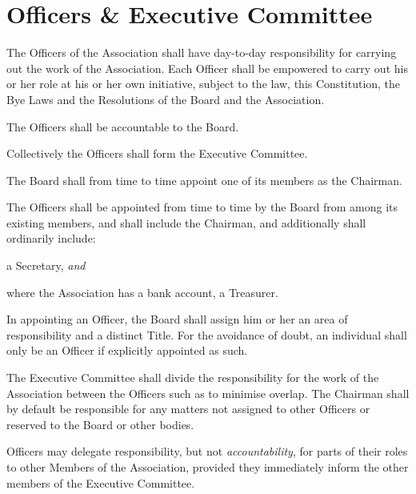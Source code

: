 \documentclass[12pt]{article}
\newcommand{\EC}[0]{Board}
\newcommand{\Exec}[0]{\EC{} }
\newcommand{\avoiddoubt}[0]{For the avoidance of doubt}
\newcommand{\ITand}[0]{\textit{and}}
\begin{document}
\section{Officers \& Executive Committee}
  \begin{constenum}
    \item The Officers of the Association shall have day-to-day
      responsibility for carrying out the work of the Association.
      Each Officer shall be empowered to carry out his or her role at
      his or her own initiative, subject to the law, this
      Constitution, the Bye Laws and the Resolutions of the \Exec and
      the Association.

    \item The Officers shall be accountable to the \EC{}.

    \item Collectively the Officers shall form the Executive Committee.

    \item The \Exec shall from time to time appoint one of its members
      as the Chairman.

    \item The Officers shall be appointed from time to time by
      the \Exec from among its existing members, and shall include
      the Chairman, and additionally shall ordinarily include:
      \begin{constenum}
      \item a Secretary, \ITand
      \item where the Association has a bank account, a Treasurer.
      \end{constenum}

    \item In appointing an Officer, the \Exec shall assign him or her
      an area of responsibility and a distinct Title.
      \avoiddoubt, an individual shall only be an Officer if explicitly
      appointed as such.

    \item The Executive Committee shall divide the responsibility for
      the work of the Association between the Officers such as to
      minimise overlap. The Chairman shall by default be responsible for any
      matters not assigned to other Officers or reserved to the \Exec or
      other bodies.

    \item Officers may delegate responsibility, but not
      \textit{accountability}, for parts of their roles to other
      Members of the Association, provided they immediately inform the
      other members of the Executive Committee.


\end{constenum}
\end{document}
